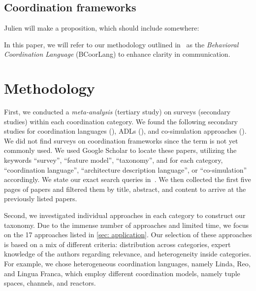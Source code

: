 \documentclass[runningheads]{llncs}
\newcommand{\quotes}[1]{``#1''}
\begin{document}
\subsection{Coordination frameworks} \label{subsec: frameworks}

Julien will make a proposition, which should include somewhere:

In this paper, we will refer to our methodology outlined in~\cite{krauterBehavioralConsistencyMultimodeling2023} as the \textit{Behavioral Coordination Language} (BCoorLang) to enhance clarity in communication.

\section{Methodology}
First, we conducted a \textit{meta-analysis} (tertiary study) on surveys (secondary studies) within each coordination category.
We found the following  secondary studies for coordination languages (\cite{papadopoulosCoordinationModelsLanguages1998,goosCoordinationModelsLanguages2001,rossiTuplebasedTechnologiesCoordination2001}), ADLs (\cite{clementsSurveyArchitectureDescription1996,medvidovicClassificationComparisonFramework2000,hussainInvestigatingArchitectureDescription2013,ozkayaAreWeThere2013,malavoltaWhatIndustryNeeds2013}), and co-simulation approaches (\cite{gomesCoSimulationSurvey2019,schweigerEmpiricalSurveyCosimulation2019,hafnerOverviewStateArt2021}).
We did not find surveys on coordination frameworks since the term is not yet commonly used.
We used Google Scholar to locate these papers, utilizing the keywords \quotes{survey}, \quotes{feature model}, \quotes{taxonomy}, and for each category, \quotes{coordination language}, \quotes{architecture description language}, or \quotes{co-simulation} accordingly.
We state our exact search queries in~\cite{timkrauterArtifactsCoordination2024}.
We then collected the first five pages of papers and filtered them by title, abstract, and content to arrive at the previously listed papers.

Second, we investigated individual approaches in each category to construct our taxonomy.
Due to the immense number of approaches and limited time, we focus on the 17 approaches listed in \autoref{sec: application}.
Our selection of these approaches is based on a mix of different criteria: distribution across categories, expert knowledge of the authors regarding relevance, and heterogeneity inside categories.
For example, we chose heterogeneous coordination languages, namely Linda, Reo, and Lingua Franca, which employ different coordination models, namely tuple spaces, channels, and reactors.
\end{document}
